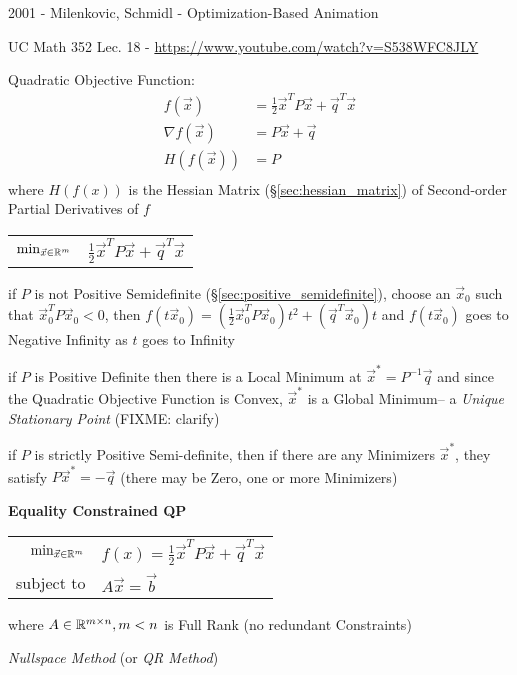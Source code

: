2001 - Milenkovic, Schmidl - Optimization-Based Animation

UC Math 352 Lec. 18 - \url{https://www.youtube.com/watch?v=S538WFC8JLY}

Quadratic Objective Function:
\begin{align*}
  f(\vec{x})        & = \frac{1}{2}\vec{x}^T P \vec{x} + \vec{q}^T\vec{x} \\
  \nabla f(\vec{x}) & = P\vec{x} + \vec{q} \\
  H(f(\vec{x}))     & = P \\
\end{align*}
where $H(f(x))$ is the Hessian Matrix (\S\ref{sec:hessian_matrix}) of
Second-order Partial Derivatives of $f$

\begin{tabular}{r l}
  $\mathrm{min}_{\vec{x} \in \mathbb{R}^m}$ &
    $\frac{1}{2}\vec{x}^T P\vec{x} + \vec{q}^T\vec{x}$ \\
\end{tabular}

if $P$ is not Positive Semidefinite (\S\ref{sec:positive_semidefinite}), choose
an $\vec{x}_0$ such that $\vec{x}_0^T P\vec{x}_0 < 0$, then
$f(t\vec{x}_0) = (\frac{1}{2}\vec{x}_0^TP\vec{x}_0)t^2 + (\vec{q}^T\vec{x}_0)t$
and $f(t\vec{x}_0)$ goes to Negative Infinity as $t$ goes to Infinity

if $P$ is Positive Definite then there is a Local Minimum at $\vec{x}^* =
P^{-1}\vec{q}$ and since the Quadratic Objective Function is Convex,
$\vec{x}^*$ is a Global Minimum-- a \emph{Unique Stationary Point} (FIXME:
clarify)

if $P$ is strictly Positive Semi-definite, then if there are any Minimizers
$\vec{x}^*$, they satisfy $P\vec{x}^* = - \vec{q}$ (there may be Zero, one or
more Minimizers)


\textbf{Equality Constrained QP}

\begin{tabular}{r l}
  $\mathrm{min}_{\vec{x} \in \mathbb{R}^m}$ &
    $f(x) = \frac{1}{2}\vec{x}^T P\vec{x} + \vec{q}^T\vec{x}$ \\
  subject to & $A\vec{x} = \vec{b}$ \\
\end{tabular}

where $A \in \mathbb{R}^{m \times n}, m < n$ is Full Rank (no redundant
Constraints)

\emph{Nullspace Method} (or \emph{QR Method})

